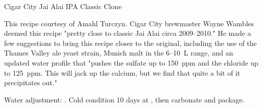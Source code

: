 \begin{recipie}{Cigar City Jai Alai IPA Classic Clone}

\begin{aboutblock}
This recipe courtesy of Amahl Turczyn. Cigar City brewmaster Wayne Wambles deemed
this recipe "pretty close to classic Jai Alai circa 2009--2010." He made a few
suggestions to bring this recipe closer to the original, including the use of
the Thames Valley ale yeast strain, Munich malt in the 6--10~L range, and an
updated water profile that "pushes the sulfate up to 150~ppm and the chloride
up to 125~ppm. This will jack up the calcium, but we find that quite a bit of
it precipitates out." 
\end{aboutblock}


\begin{methodandtiming}
 
\begin{mashsteps}
\end{mashsteps}

\begin{fermentationsteps}
\end{fermentationsteps}

\begin{directions}
Water adjustment: . Cold condition
10 days at , then carbonate and package.
\end{directions}

\end{methodandtiming}

\pagebreak

\begin{ingredientsblock}

\begin{malts}
\end{malts}

\begin{hops}
\end{hops}


\end{ingredientsblock}
\end{recipie}
